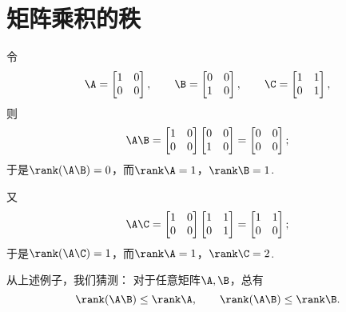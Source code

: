 \section{矩阵乘积的秩}
令\[
	\A=\begin{bmatrix}
		1 & 0 \\
		0 & 0
	\end{bmatrix}, \qquad
	\B=\begin{bmatrix}
		0 & 0 \\
		1 & 0
	\end{bmatrix}, \qquad
	\C=\begin{bmatrix}
		1 & 1 \\
		0 & 1
	\end{bmatrix},
\]
则\[
	\A \B=\begin{bmatrix}
		1 & 0 \\
		0 & 0
	\end{bmatrix}
	\begin{bmatrix}
		0 & 0 \\
		1 & 0
	\end{bmatrix}
	= \begin{bmatrix}
		0 & 0 \\
		0 & 0
	\end{bmatrix};
\]
于是\(\rank(\A \B)=0\)，而\(\rank\A=1\)，\(\rank\B=1\).

又\[
	\A\C=\begin{bmatrix}
		1 & 0 \\
		0 & 0
	\end{bmatrix}
	\begin{bmatrix}
		1 & 1 \\
		0 & 1
	\end{bmatrix}
	= \begin{bmatrix}
		1 & 1 \\
		0 & 0
	\end{bmatrix};
\]
于是\(\rank(\A\C)=1\)，而\(\rank\A=1\)，\(\rank\C=2\).

从上述例子，我们猜测：
对于任意矩阵\(\A,\B\)，总有\[
	\rank(\A \B) \leq \rank\A, \qquad
	\rank(\A \B) \leq \rank\B.
\]

